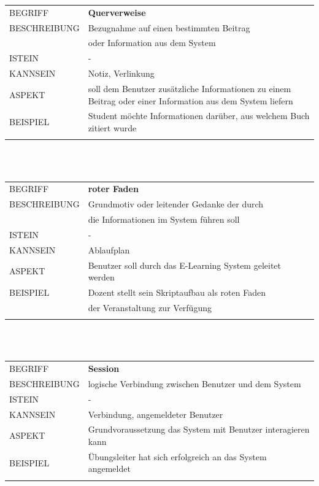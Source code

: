 \documentclass[12pt,a4paper]{article}
\begin{document}
\begin{tabular}{l p{12cm}}
BEGRIFF 	 & \textbf{Querverweise} \\ 
BESCHREIBUNG & Bezugnahme auf einen bestimmten Beitrag\\
			 & oder Information aus dem System\\ 
ISTEIN   	 & - \\
KANNSEIN 	 & Notiz, Verlinkung\\ 
ASPEKT   	 & soll dem Benutzer zusätzliche Informationen zu einem Beitrag 				   oder einer Information aus dem System liefern\\
BEISPIEL 	 & Student möchte Informationen darüber, aus welchem Buch zitiert wurde\\\\
\hline
\end{tabular}\\\\  

\begin{tabular}{l p{12cm}}
BEGRIFF 	 & \textbf{roter Faden} \\ 
BESCHREIBUNG & Grundmotiv oder leitender Gedanke der durch\\
			 &  die Informationen im System führen soll\\ 
ISTEIN   	 & - \\
KANNSEIN 	 & Ablaufplan \\ 
ASPEKT   	 & Benutzer soll durch das E-Learning System geleitet werden\\
BEISPIEL 	 & Dozent stellt sein Skriptaufbau als roten Faden\\
			 & der Veranstaltung zur Verfügung\\\\
\hline
\end{tabular}\\\\  

\begin{tabular}{l p{12cm}}
BEGRIFF 	 & \textbf{Session} \\ 
BESCHREIBUNG & logische Verbindung zwischen Benutzer und dem System\\ 
ISTEIN   	 & -\\
KANNSEIN 	 & Verbindung, angemeldeter Benutzer\\ 
ASPEKT   	 & Grundvoraussetzung das System mit Benutzer interagieren kann\\
BEISPIEL 	 & Übungsleiter hat sich erfolgreich an das System angemeldet\\\\
\hline
\end{tabular}\\\\  
\end{document}
